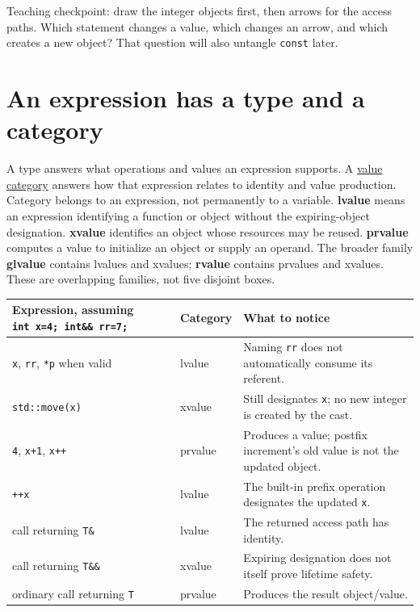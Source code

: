 Teaching checkpoint: draw the integer objects first, then arrows for the access paths. Which statement changes a value, which changes an arrow, and which creates a new object? That question will also untangle \texttt{const} later.

\section{An expression has a type and a category}\label{01-foundations-i-ch003-an-expression-has-a-type-and-a-category}

A type answers what operations and values an expression supports. A \hyperref[appendix-1121b30eaeb0]{value category} answers how that expression relates to identity and value production. Category belongs to an expression, not permanently to a variable. \textbf{lvalue} means an expression identifying a function or object without the expiring-object designation. \textbf{xvalue} identifies an object whose resources may be reused. \textbf{prvalue} computes a value to initialize an object or supply an operand. The broader family \textbf{glvalue} contains lvalues and xvalues; \textbf{rvalue} contains prvalues and xvalues. These are overlapping families, not five disjoint boxes.

{\def\LTcaptype{none} %
\begin{longtable}[]{@{}
  >{\raggedright\arraybackslash}p{}
  >{\raggedright\arraybackslash}p{}
  >{\raggedright\arraybackslash}p{}@{}}
\toprule\noalign{}
\begin{minipage}[b]{\linewidth}\raggedright
Expression, assuming \texttt{int\ x=4;\ int\&\&\ rr=7;}
\end{minipage} & \begin{minipage}[b]{\linewidth}\raggedright
Category
\end{minipage} & \begin{minipage}[b]{\linewidth}\raggedright
What to notice
\end{minipage} \\
\midrule\noalign{}
\endhead
\bottomrule\noalign{}
\endlastfoot
\texttt{x}, \texttt{rr}, \texttt{*p} when valid & lvalue & Naming \texttt{rr} does not automatically consume its referent. \\
\texttt{std::move(x)} & xvalue & Still designates \texttt{x}; no new integer is created by the cast. \\
\texttt{4}, \texttt{x+1}, \texttt{x++} & prvalue & Produces a value; postfix increment's old value is not the updated object. \\
\texttt{++x} & lvalue & The built-in prefix operation designates the updated \texttt{x}. \\
call returning \texttt{T\&} & lvalue & The returned access path has identity. \\
call returning \texttt{T\&\&} & xvalue & Expiring designation does not itself prove lifetime safety. \\
ordinary call returning \texttt{T} & prvalue & Produces the result object/value. \\
\end{longtable}
}

